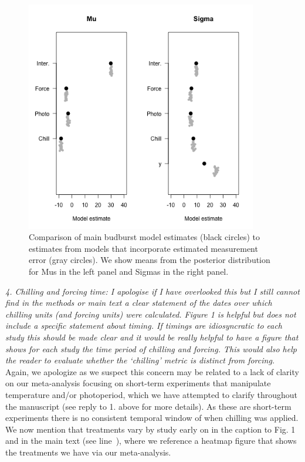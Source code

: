 \documentclass{article}
\newcommand{\lr}[1]{line~\lineref{#1}}
\begin{document}
\begin{figure}[h!]
\centering
\noindent \includegraphics[width=0.9\textwidth]{..//..//..//..//analyses/bb_analysis/figures/measerrcomp.png}
\caption{Comparison of main budburst model estimates (black circles) to estimates from models that incorporate estimated measurement error (gray circles). We show means from the posterior distribution for Mus in the left panel and Sigmas  in the right panel.}
\label{fig:trtmap}
\end{figure}


\emph{4. Chilling and forcing time: I apologise if I have overlooked this but I still cannot find in the
methods or main text a clear statement of the dates over which chilling units (and forcing
units) were calculated. Figure 1 is helpful but does not include a specific statement about
timing. If timings are idiosyncratic to each study this should be made clear and it would be
really helpful to have a figure that shows for each study the time period of chilling and forcing.
This would also help the reader to evaluate whether the `chilling' metric is distinct from
forcing.}\\

Again, we apologize as we suspect this concern may be related to a lack of clarity on our meta-analysis focusing on short-term experiments that manipulate temperature and/or photoperiod, which we have attempted to clarify throughout the manuscript (see reply to 1. above for more details). As these are short-term experiments there is no consistent temporal window of when chilling was applied. We now mention that treatments vary by study early on in the caption to Fig. 1 and in the main text (see \lr{heatmap}), where we reference a heatmap figure that shows the treatments we have via our meta-analysis.\\ 
\end{document}
